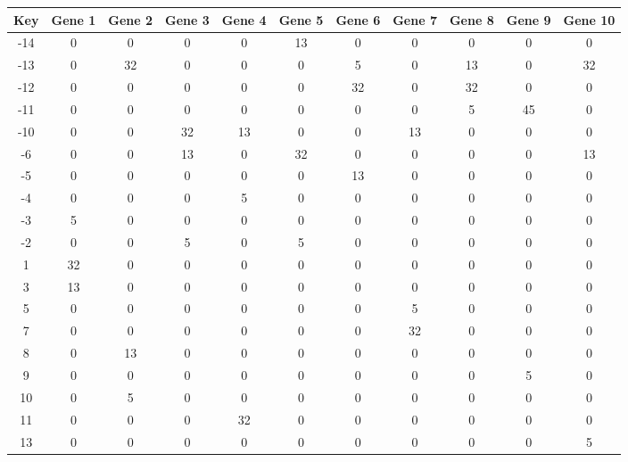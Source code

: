 \begin{tabular}{|c|c|c|c|c|c|c|c|c|c|c|}
\hline
Key & Gene 1 & Gene 2 & Gene 3 & Gene 4 & Gene 5 & Gene 6 & Gene 7 & Gene 8 & Gene 9 & Gene 10 \\
\hline
-14 & 0 & 0 & 0 & 0 & 13 & 0 & 0 & 0 & 0 & 0 \\
-13 & 0 & 32 & 0 & 0 & 0 & 5 & 0 & 13 & 0 & 32 \\
-12 & 0 & 0 & 0 & 0 & 0 & 32 & 0 & 32 & 0 & 0 \\
-11 & 0 & 0 & 0 & 0 & 0 & 0 & 0 & 5 & 45 & 0 \\
-10 & 0 & 0 & 32 & 13 & 0 & 0 & 13 & 0 & 0 & 0 \\
-6 & 0 & 0 & 13 & 0 & 32 & 0 & 0 & 0 & 0 & 13 \\
-5 & 0 & 0 & 0 & 0 & 0 & 13 & 0 & 0 & 0 & 0 \\
-4 & 0 & 0 & 0 & 5 & 0 & 0 & 0 & 0 & 0 & 0 \\
-3 & 5 & 0 & 0 & 0 & 0 & 0 & 0 & 0 & 0 & 0 \\
-2 & 0 & 0 & 5 & 0 & 5 & 0 & 0 & 0 & 0 & 0 \\
1 & 32 & 0 & 0 & 0 & 0 & 0 & 0 & 0 & 0 & 0 \\
3 & 13 & 0 & 0 & 0 & 0 & 0 & 0 & 0 & 0 & 0 \\
5 & 0 & 0 & 0 & 0 & 0 & 0 & 5 & 0 & 0 & 0 \\
7 & 0 & 0 & 0 & 0 & 0 & 0 & 32 & 0 & 0 & 0 \\
8 & 0 & 13 & 0 & 0 & 0 & 0 & 0 & 0 & 0 & 0 \\
9 & 0 & 0 & 0 & 0 & 0 & 0 & 0 & 0 & 5 & 0 \\
10 & 0 & 5 & 0 & 0 & 0 & 0 & 0 & 0 & 0 & 0 \\
11 & 0 & 0 & 0 & 32 & 0 & 0 & 0 & 0 & 0 & 0 \\
13 & 0 & 0 & 0 & 0 & 0 & 0 & 0 & 0 & 0 & 5 \\
\hline
\end{tabular}